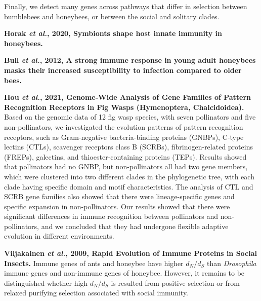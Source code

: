 \documentclass[11pt]{article}
\begin{document}
\begin{sloppypar}
Finally, we detect many genes across pathways that differ in selection between bumblebees and honeybees, or between the social and solitary clades.
\par
\textbf{Horak \textit{et al.}, 2020, Symbionts shape host innate immunity in honeybees.} \newline
\par
\textbf{Bull \textit{et al.}, 2012, A strong immune response in young adult honeybees masks their increased susceptibility to infection compared to older bees.}
\par
\textbf{Hou \textit{et al.}, 2021, Genome-Wide Analysis of Gene Families of Pattern Recognition Receptors in Fig Wasps (Hymenoptera, Chalcidoidea).} \newline
Based on the genomic data of 12 fig wasp species, with seven pollinators and five non-pollinators, we investigated the evolution patterns of pattern recognition receptors, such as Gram-negative bacteria-binding proteins (GNBPs), C-type lectins (CTLs), scavenger receptors class B (SCRBs), fibrinogen-related proteins (FREPs), galectins, and thioester-containing proteins (TEPs). 
Results showed that pollinators had no GNBP, but non-pollinators all had two gene members, which were clustered into two different clades in the phylogenetic tree, with each clade having specific domain and motif characteristics. 
The analysis of CTL and SCRB gene families also showed that there were lineage-specific genes and specific expansion in non-pollinators. 
Our results showed that there were significant differences in immune recognition between pollinators and non-pollinators, and we concluded that they had undergone flexible adaptive evolution in different environments.
\par
\textbf{Viljakainen \textit{et al.}, 2009, Rapid Evolution of Immune Proteins in Social Insects.} \newline
Immune genes of ants and honeybee have higher $d_N/d_S$ than \textit{Drosophila} immune genes and non-immune genes of honeybee. 
However, it remains to be distinguished whether high $d_N/d_S$ is resulted from positive selection or from relaxed purifying selection associated with social immunity.
\par

\end{sloppypar}
\end{document}
